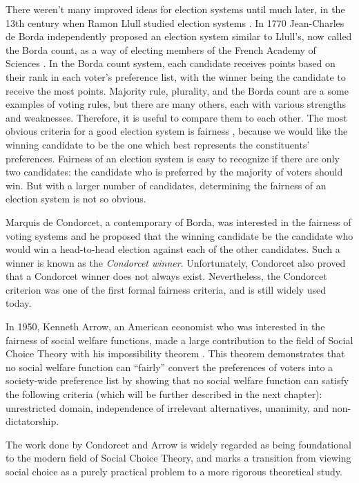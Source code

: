 	There weren't many improved ideas for election systems until much later, in the 13th century when Ramon Llull studied election systems \cite{hägele2001llull}. In 1770 Jean-Charles de Borda independently proposed an election system similar to Llull's, now called the Borda count, as a way of electing members of the French Academy of Sciences \cite{borda1781mémoire}. In the Borda count system, each candidate receives points based on their rank in each voter's preference list, with the winner being the candidate to receive the most points. Majority rule, plurality, and the Borda count are a some examples of voting rules, but there are many others, each with various strengths and weaknesses. Therefore, it is useful to compare them to each other. The most obvious criteria for a good election system is fairness \cite{chevaleyre2006issues}, because we would like the winning candidate to be the one which best represents the constituents' preferences. Fairness of an election system is easy to recognize if there are only two candidates: the candidate who is preferred by the majority of voters should win. But with a larger number of candidates, determining the fairness of an election system is not so obvious.

	Marquis de Condorcet, a contemporary of Borda, was interested in the fairness of voting systems and he proposed that the winning candidate be the candidate who would win a head-to-head election against each of the other candidates. Such a winner is known as the \emph{Condorcet winner}. Unfortunately, Condorcet also proved that a Condorcet winner does not always exist. Nevertheless, the Condorcet criterion was one of the first formal fairness criteria, and is still widely used today.

	In 1950, Kenneth Arrow, an American economist who was interested in the fairness of social welfare functions, made a large contribution to the field of Social Choice Theory with his impossibility theorem \cite{arrow1950difficulty, arrow1963social}. This theorem demonstrates that no social welfare function can ``fairly'' convert the preferences of voters into a society-wide preference list by showing that no social welfare function can satisfy the following criteria (which will be further described in the next chapter): unrestricted domain, independence of irrelevant alternatives, unanimity, and non-dictatorship.

	The work done by Condorcet and Arrow is widely regarded as being foundational to the modern field of Social Choice Theory, and marks a transition from viewing social choice as a purely practical problem to a more rigorous theoretical study.

